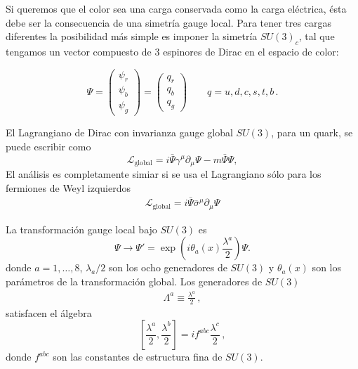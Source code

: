 

Si queremos que el color sea una carga conservada como la carga eléctrica, ésta debe ser la consecuencia de una simetría gauge local. Para tener tres cargas diferentes la posibilidad más simple es imponer la simetría $SU(3)_c$, tal que tengamos un vector compuesto de 3 espinores de Dirac en el espacio de color:

\begin{frame}  
\begin{equation}
  \Psi=
  \begin{pmatrix}
    \psi_r\\
    \psi_b\\
    \psi_g
  \end{pmatrix}
  =
  \begin{pmatrix}
    q_r\\
    q_b\\
    q_g
  \end{pmatrix}\qquad q=u,d,c,s,t,b\,.
\end{equation}
\end{frame}
El Lagrangiano de Dirac con invarianza gauge global $SU(3)$, para un quark, se puede escribir como
\begin{equation}
  \label{eq:128qft}
  \mathcal{L}_{\text{global}}=i\bar{\Psi}\gamma^\mu\partial_\mu\Psi-m\bar{\Psi}\Psi,
\end{equation}
El análisis es completamente simiar si se usa el Lagrangiano sólo para los fermiones de Weyl izquierdos
\begin{align}
    \mathcal{L}_{\text{global}}=i\bar{\Psi}\overline{\sigma}^\mu\partial_\mu\Psi
\end{align}

\begin{frame}
  
La transformación gauge local bajo $SU(3)$ es
\begin{equation}
  \Psi\to \Psi'=\exp\left(i\theta_a(x)\frac{\lambda^a}{2}\right)\Psi.
\end{equation}
donde $a=1,\ldots,8$, $\lambda_a/2$ son los ocho generadores de $SU(3)$ y $\theta_a(x)$ son los parámetros de la transformación global. Los generadores de $SU(3)$
\begin{align}
  \Lambda^a\equiv\frac{\lambda^a}{2}\,,
\end{align}
satisfacen el álgebra
\begin{equation}
  \left[\frac{\lambda^a}{2},\frac{\lambda^b}{2}\right]=if^{abc}\frac{\lambda^c}{2}\,,
\end{equation}
donde $f^{abc}$ son las constantes de estructura fina de $SU(3)$.
\end{frame}


